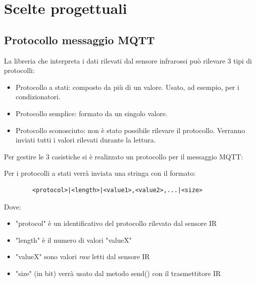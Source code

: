 \documentclass[a4paper,11pt]{article}
\begin{document}
\section{Scelte progettuali}

    \subsection{Protocollo messaggio MQTT}

    La libreria che interpreta i dati rilevati dal sensore infrarossi può rilevare 3 tipi di protocolli:
    \begin{itemize}
        \item Protocollo a stati: composto da più di un valore. Usato, ad esempio, per i condizionatori.
        \item Protocollo semplice: formato da un singolo valore.
        \item Protocollo sconosciuto: non è stato possibile rilevare il protocollo. Verranno inviati tutti i valori rilevati durante la lettura.
    \end{itemize}

    \noindent
    Per gestire le 3 casistiche si è realizzato un protocollo per il messaggio MQTT:
    \smallskip

    \begin{samepage}
      Per i protocolli a stati verrà inviata una stringa con il formato:

      \begin{verbatim}
        <protocol>|<length>|<value1>,<value2>,...|<size>
      \end{verbatim}
              
      Dove:
      \begin{itemize}
          \item "protocol" è un identificativo del protocollo rilevato dal sensore IR
          \item "length" è il numero di valori "valueX"
          \item "valueX" sono valori \emph{raw} letti dal sensore IR
          \item "size" (in bit) verrà usato dal metodo send() con il trasmettitore IR
      \end{itemize}
    \end{samepage}

    \bigskip
\end{document}
